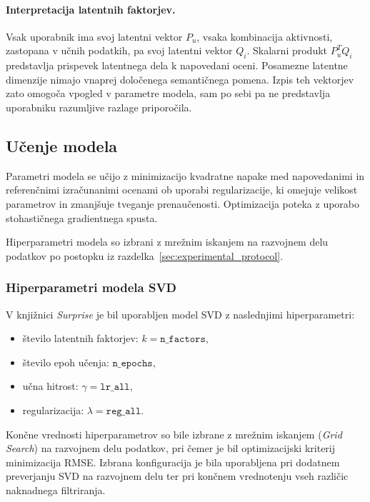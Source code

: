 \documentclass[a4paper,twoside,openright,12pt,slovene]{book}
\begin{document}
\paragraph{Interpretacija latentnih faktorjev.}
Vsak uporabnik ima svoj latentni vektor $P_u$, vsaka kombinacija
aktivnosti, zastopana v učnih podatkih, pa svoj latentni vektor $Q_i$.
Skalarni produkt $P_u^T Q_i$ predstavlja prispevek latentnega dela
k napovedani oceni. Posamezne latentne dimenzije nimajo vnaprej
določenega semantičnega pomena. Izpis teh vektorjev zato omogoča
vpogled v parametre modela, sam po sebi pa ne predstavlja
uporabniku razumljive razlage priporočila.


\subsection{Učenje modela}

Parametri modela se učijo z minimizacijo kvadratne napake med napovedanimi in referenčnimi izračunanimi ocenami ob uporabi regularizacije, ki omejuje velikost parametrov in zmanjšuje tveganje prenaučenosti. Optimizacija poteka z uporabo stohastičnega gradientnega spusta.

Hiperparametri modela so izbrani z mrežnim iskanjem na razvojnem
delu podatkov po postopku iz
razdelka~\ref{sec:experimental_protocol}.

\subsubsection{Hiperparametri modela SVD}
\label{sec:svd_hyperparams}

V knjižnici \textit{Surprise} je bil uporabljen model SVD z naslednjimi hiperparametri:
\begin{itemize}
    \item število latentnih faktorjev: $k=\texttt{n\_factors}$,
    \item število epoh učenja: $\texttt{n\_epochs}$,
    \item učna hitrost: $\gamma=\texttt{lr\_all}$,
    \item regularizacija: $\lambda=\texttt{reg\_all}$.
\end{itemize}

Končne vrednosti hiperparametrov so bile izbrane z mrežnim iskanjem (\textit{Grid Search}) na razvojnem delu podatkov, pri čemer je bil optimizacijski kriterij minimizacija RMSE. Izbrana konfiguracija je bila uporabljena pri dodatnem
preverjanju SVD na razvojnem delu ter pri končnem
vrednotenju vseh različic naknadnega filtriranja.
\end{document}
